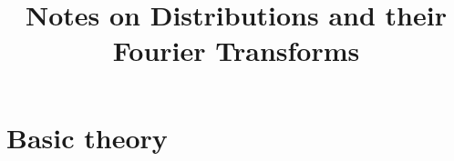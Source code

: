 \documentclass[twoside, a4paper, 10pt]{amsart}
\title[ ]{Notes on Distributions and their Fourier Transforms}
\begin{document}
\maketitle
\raggedbottom


\newcommand{\cA}{\mathcal{A}}
\newcommand{\cB}{\mathcal{B}}
\newcommand{\cC}{\mathcal{C}}
\newcommand{\cD}{\mathcal{D}}
\newcommand{\cE}{\mathcal{E}}
\newcommand{\cF}{\mathcal{F}}
\newcommand{\cG}{\mathcal{G}}
\newcommand{\cH}{\mathcal{H}}
\newcommand{\cI}{\mathcal{I}}
\newcommand{\cJ}{\mathcal{J}}
\newcommand{\cK}{\mathcal{K}}
\newcommand{\cL}{\mathcal{L}}
\newcommand{\cM}{\mathcal{M}}
\newcommand{\cN}{\mathcal{N}}
\newcommand{\cO}{\mathcal{O}}
\newcommand{\cP}{\mathcal{P}}
\newcommand{\cQ}{\mathcal{Q}}
\newcommand{\cR}{\mathcal{R}}
\newcommand{\cS}{\mathcal{S}}
\newcommand{\cT}{\mathcal{T}}
\newcommand{\cU}{\mathcal{U}}
\newcommand{\cV}{\mathcal{V}}
\newcommand{\cW}{\mathcal{W}}
\newcommand{\cX}{\mathcal{X}}
\newcommand{\cY}{\mathcal{Y}}
\newcommand{\cZ}{\mathcal{Z}}
\newcommand{\bA}{\mathbb{A}}
\newcommand{\bB}{\mathbb{B}}
\newcommand{\bC}{\mathbb{C}}
\newcommand{\bD}{\mathbb{D}}
\newcommand{\bE}{\mathbb{E}}
\newcommand{\bF}{\mathbb{F}}
\newcommand{\bG}{\mathbb{G}}
\newcommand{\bH}{\mathbb{H}}
\newcommand{\bI}{\mathbb{I}}
\newcommand{\bJ}{\mathbb{J}}
\newcommand{\bK}{\mathbb{K}}
\newcommand{\bL}{\mathbb{L}}
\newcommand{\bM}{\mathbb{M}}
\newcommand{\bN}{\mathbb{N}}
\newcommand{\bO}{\mathbb{O}}
\newcommand{\bP}{\mathbb{P}}
\newcommand{\bQ}{\mathbb{Q}}
\newcommand{\bR}{\mathbb{R}}
\newcommand{\bS}{\mathbb{S}}
\newcommand{\bT}{\mathbb{T}}
\newcommand{\bU}{\mathbb{U}}
\newcommand{\bV}{\mathbb{V}}
\newcommand{\bW}{\mathbb{W}}
\newcommand{\bX}{\mathbb{X}}
\newcommand{\bY}{\mathbb{Y}}
\newcommand{\bZ}{\mathbb{Z}}


 

\theoremstyle{definition}
\newtheorem{mydef}[dummy]{Definition}
\newtheorem{prop}[dummy]{Proposition}
\newtheorem{corol}[dummy]{Corollary}
\newtheorem{thm}[dummy]{Theorem}
\newtheorem{lemma}[dummy]{Lemma}
\newtheorem{eg}[dummy]{Example}
\newtheorem{notation}[dummy]{Notation}
\newtheorem{remark}[dummy]{Remark}
\newtheorem{claim}[dummy]{Claim}
\newtheorem{Exercise}[dummy]{Exercise}
\newtheorem{question}[dummy]{Question}

\tableofcontents

\part{Basic theory}
\end{document}
